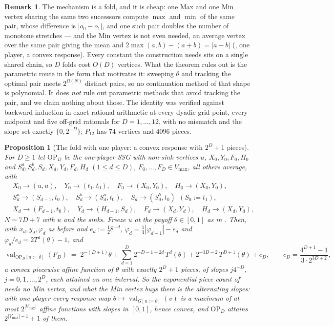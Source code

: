 \documentclass[11pt]{article}
\theoremstyle{plain}
\newtheorem{proposition}[theorem]{Proposition}
\theoremstyle{definition}
\newtheorem{remark}[theorem]{Remark}
\DeclareMathOperator{\val}{val}
\newcommand{\Vmax}{V_{\max}}
\begin{document}
\begin{remark}\label{rem:fold}
The mechanism is a fold, and it is cheap: one Max and one Min vertex sharing the
same two successors compute $\max$ and $\min$ of the same pair, whose difference
is $|o_0-o_1|$, and one such pair doubles the number of monotone stretches ---
and the Min vertex is not even needed, an average vertex over the same pair
giving the mean and $2\max(a,b)-(a+b)=|a-b|$
(, one player, a convex response).
Every constant the construction needs sits on a single shared chain, so $D$
folds cost $O(D)$ vertices. What the theorem rules out is the parametric route
in the form that motivates it: sweeping $\theta$ and tracking the optimal pair
meets $2^{\Omega(N)}$ distinct pairs, so no continuation method of that shape is
polynomial. It does \emph{not} rule out parametric methods that avoid tracking
the pair, and we claim nothing about those. The identity was verified against
backward induction in exact rational arithmetic at every dyadic grid point,
every midpoint and five off-grid rationals for $D=1,\dots,12$, with no mismatch
and the slope set exactly $\{0,2^{-D}\}$; $P_{12}$ has $74$ vertices and
$4096$ pieces.
\end{remark}

\begin{proposition}[The fold with one player: a convex response with $2^{D}+1$ pieces]\label{prop:one-player-response}
For $D\ge1$ let $\mathrm{OP}_D$ be the one-player SSG with non-sink
vertices $u$, $X_0,Y_0,F_0,H_0$ and $S^{a}_d,S^{b}_d,S_d,X_d,Y_d,F_d,H_d$
$(1\le d\le D)$, $F_0,\dots,F_D\in\Vmax$, all others average, with
\[
\begin{aligned}
 &X_0\to(u,u),\quad Y_0\to(t_1,t_0),\quad F_0\to(X_0,Y_0),\quad H_0\to(X_0,Y_0),\\
 &S^{a}_d\to(S_{d-1},t_0),\quad S^{b}_d\to(S^{a}_d,t_0),\quad S_d\to(S^{b}_d,t_0)\ \ (S_0:=t_1),\\
 &X_d\to(F_{d-1},t_0),\quad Y_d\to(H_{d-1},S_d),\quad F_d\to(X_d,Y_d),\quad H_d\to(X_d,Y_d),
\end{aligned}
\]
$N=7D+7$ with $u$ and the sinks. Freeze $u$ at the payoff $\theta\in[0,1]$
as in . Then, with $x_d,y_d,\varphi_d$ as before and
$e_d:=\tfrac12 8^{-d}$, $\varphi_d=\tfrac14|\varphi_{d-1}|-e_d$ and
$\varphi_d/e_d=2T^{d}(\theta)-1$, and
\[
  \val_{\mathrm{OP}_D[u:=\theta]}(F_D)
  \;=\;2^{-(D+1)}\theta+\sum_{d=1}^{D}2^{-D-1-2d}\,T^{d}(\theta)
  +2^{-3D-2}\,T^{D+1}(\theta)+c_D,
  \qquad c_D=\frac{4^{D+1}-1}{3\cdot2^{3D+2}},
\]
a \emph{convex} piecewise affine function of $\theta$ with exactly
$2^{D}+1$ pieces, of slopes $j4^{-D}$, $j=0,1,\dots,2^{D}$, each attained
on one interval. So the exponential piece count of  needs no
Min vertex, and what the Min vertex buys there is the alternating slopes:
with one player every response map $\theta\mapsto\val_{G[u:=\theta]}(v)$ is
a maximum of at most $2^{|\Vmax|}$ affine functions with slopes in $[0,1]$,
hence convex, and $\mathrm{OP}_D$ attains $2^{|\Vmax|-1}+1$ of them.
\end{proposition}
\end{document}
